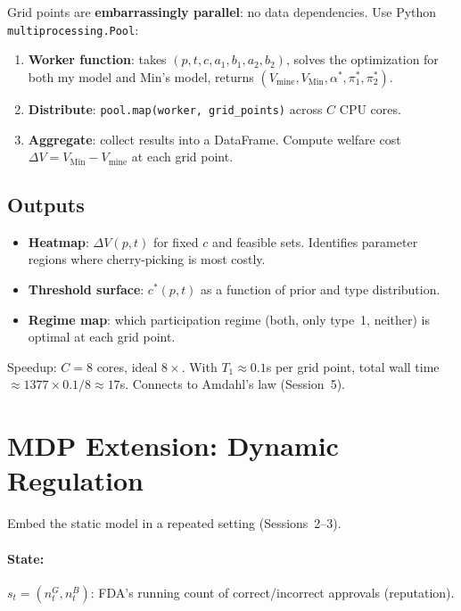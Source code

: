 \documentclass[12pt,a4paper]{article}
\begin{document}
Grid points are \textbf{embarrassingly parallel}: no data
dependencies. Use Python \texttt{multiprocessing.Pool}:

\begin{enumerate}
  \item \textbf{Worker function}: takes
    $(p, t, c, a_1, b_1, a_2, b_2)$, solves the
    optimization for both my model and Min's model,
    returns $(V_{\text{mine}}, V_{\text{Min}},
    \alpha^*, \pi_1^*, \pi_2^*)$.

  \item \textbf{Distribute}: \texttt{pool.map(worker,
    grid\_points)} across $C$ CPU cores.

  \item \textbf{Aggregate}: collect results into a
    DataFrame. Compute welfare cost
    $\Delta V = V_{\text{Min}} - V_{\text{mine}}$
    at each grid point.
\end{enumerate}

\subsection{Outputs}

\begin{itemize}
  \item \textbf{Heatmap}: $\Delta V(p, t)$ for fixed
    $c$ and feasible sets. Identifies parameter regions
    where cherry-picking is most costly.
  \item \textbf{Threshold surface}: $c^*(p, t)$ as a
    function of prior and type distribution.
  \item \textbf{Regime map}: which participation regime
    (both, only type~1, neither) is optimal at each
    grid point.
\end{itemize}

Speedup: $C = 8$ cores, ideal $8\times$. With
$T_1 \approx 0.1$s per grid point, total wall time
$\approx 1377 \times 0.1 / 8 \approx 17$s. Connects to
Amdahl's law (Session~5).


\section{MDP Extension: Dynamic Regulation}
\label{sec:mdp}

Embed the static model in a repeated setting (Sessions~2--3).

\paragraph{State:}
$s_t = (n_t^G, n_t^B)$: FDA's running count of
correct/incorrect approvals (reputation).
\end{document}
